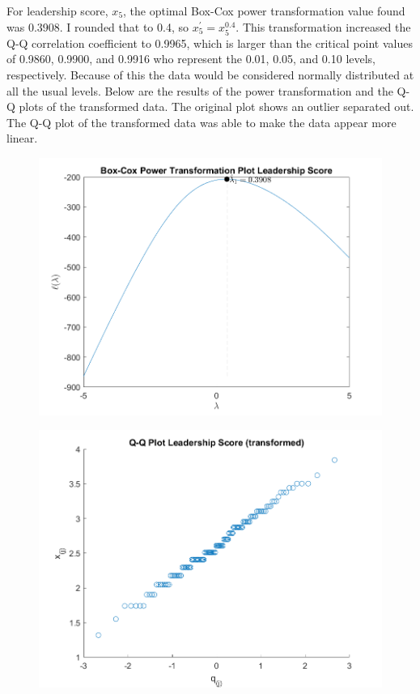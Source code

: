 \begin{enumerate}[label= (\alph*)]
    For leadership score, $x_{5}$, the optimal Box-Cox power transformation value found was 0.3908.
    I rounded that to 0.4, so $x_{5}^{\prime} = x_{5}^{0.4}$. This transformation increased the Q-Q correlation coefficient to 0.9965, which is larger than the critical point values of 0.9860, 0.9900, and 0.9916 who represent the 0.01, 0.05, and 0.10 levels, respectively.
    Because of this the data would be considered normally distributed at all the usual levels.
    Below are the results of the power transformation and the Q-Q plots of the transformed data.
    The original plot shows an outlier separated out. The Q-Q plot of the transformed data was able to make the data appear more linear.

    \begin{center}
        \begin{figure}[H]
            \centering
            \includegraphics[scale=0.4]{./matlab/chapter-4/sol4.39.power.5.png}
        \end{figure}
    \end{center}
    
    \begin{center}
        \begin{figure}[H]
            \centering
            \includegraphics[scale=0.4]{./matlab/chapter-4/sol4.39.qq.tr.5.png}
        \end{figure}
    \end{center}

\end{enumerate}